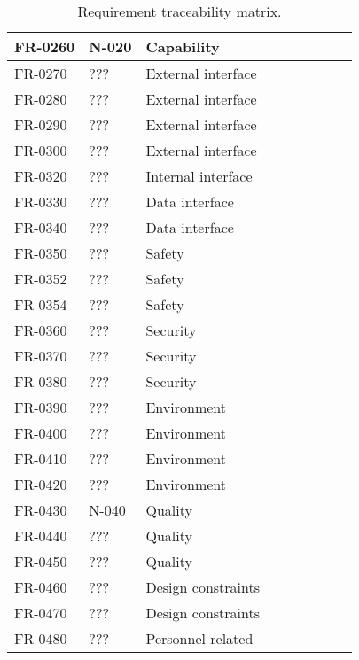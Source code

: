 \begin{sidewaystable}
\begin{table}[H]
\begin{tabular}{|p{2cm}|p{2cm}|p{3cm}|p{2cm}|p{2cm}|p{2cm}|p{2cm}|p{2cm}|p{2cm}|}
 FR-0260 & N-020 & Capability & & & & & &\\ \hline
 FR-0270 & ??? & External interface & & & & & &\\ \hline
 FR-0280 & ??? & External interface & & & & & &\\ \hline
 FR-0290 & ??? & External interface & & & & & &\\ \hline
 FR-0300 & ??? & External interface & & & & & &\\ \hline
 FR-0320 & ??? & Internal interface & & & & & &\\ \hline
 FR-0330 & ??? & Data interface & & & & & &\\ \hline
 FR-0340 & ??? & Data interface & & & & & &\\ \hline
 FR-0350 & ??? & Safety & & & & & &\\ \hline
 FR-0352 & ??? & Safety & & & & & &\\ \hline
 FR-0354 & ??? & Safety & & & & & &\\ \hline
 FR-0360 & ??? & Security & & & & & &\\ \hline
 FR-0370 & ??? & Security & & & & & &\\ \hline   	
 FR-0380 & ??? & Security & & & & & &\\ \hline
 FR-0390 & ??? & Environment & & & & & &\\ \hline
 FR-0400 & ??? & Environment & & & & & &\\ \hline
 FR-0410 & ??? & Environment & & & & & &\\ \hline
 FR-0420 & ??? & Environment & & & & & &\\ \hline
 FR-0430 & N-040 & Quality & & & & & &\\ \hline
 FR-0440 & ??? & Quality & & & & & &\\ \hline
 FR-0450 & ??? & Quality & & & & & &\\ \hline
 FR-0460 & ??? & Design constraints & & & & & &\\ \hline
 FR-0470 & ??? & Design constraints & & & & & &\\ \hline
 FR-0480 & ??? & Personnel-related & & & & & &\\ \hline 
 
\end{tabular}	
\caption{Requirement traceability matrix.}
\end{table}

\end{sidewaystable}